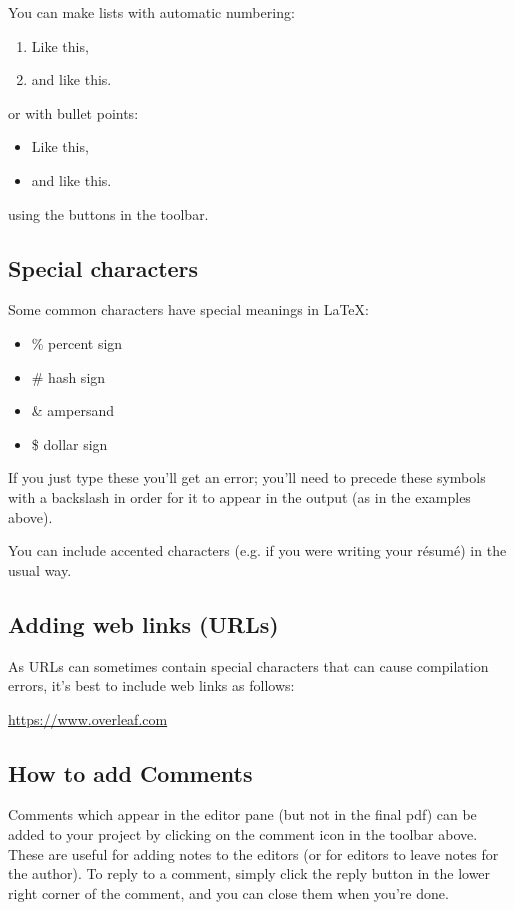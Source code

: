 \documentclass{tufte-handout}
\begin{document}
You can make lists with automatic numbering:
\begin{enumerate}
\item Like this,
\item and like this.
\end{enumerate}
or with bullet points:
\begin{itemize}
\item Like this,
\item and like this.
\end{itemize}
using the buttons in the toolbar.

\subsection{Special characters}

Some common characters have special meanings in \LaTeX{}:

\begin{itemize}
\item \% percent sign
\item \# hash sign
\item \& ampersand
\item \$ dollar sign
\end{itemize}

If you just type these you'll get an error; you'll need to precede these symbols with a backslash in order for it to appear in the output (as in the examples above).

You can include accented characters (e.g. if you were writing your résumé) in the usual way.

\subsection{Adding web links (URLs)}

As URLs can sometimes contain special characters that can cause compilation errors, it's best to include web links as follows:

\url{https://www.overleaf.com}

\subsection{How to add Comments}

Comments which appear in the editor pane (but not in the final pdf) can be added to your project by clicking on the comment icon in the toolbar above. These are useful for adding notes to the editors (or for editors to leave notes for the author).%
%
%
To reply to a comment, simply click the reply button in the lower right corner of the comment, and you can close them when you're done.
\end{document}
